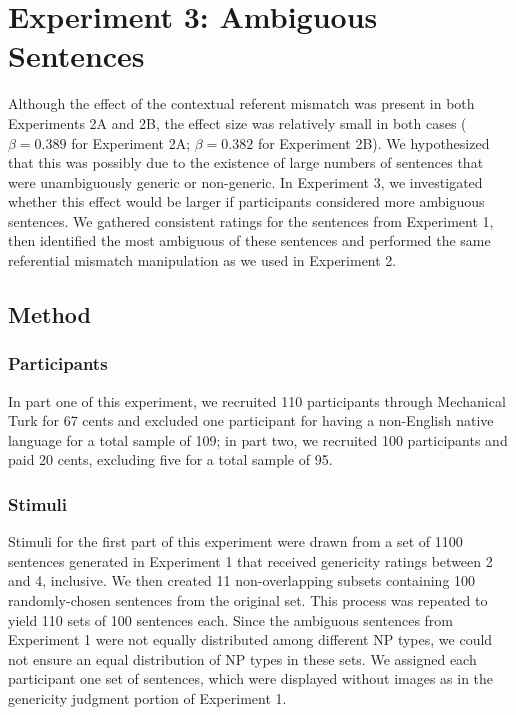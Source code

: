 \documentclass[10pt,letterpaper]{article}
\begin{document}



\section{Experiment 3: Ambiguous Sentences}

Although the effect of the contextual referent mismatch was present in both Experiments 2A and 2B, the effect size was relatively small in both cases (\(\beta = 0.389\) for Experiment 2A; \(\beta = 0.382\) for Experiment 2B). We hypothesized that this was possibly due to the existence of large numbers of sentences that were unambiguously generic or non-generic. In Experiment 3, we investigated whether this effect would be larger if participants considered more ambiguous sentences. We gathered consistent ratings for the sentences from Experiment 1, then identified the most ambiguous of these sentences and performed the same referential mismatch manipulation as we used in Experiment 2. 

\subsection{Method} 

\subsubsection{Participants}

In part one of this experiment, we recruited 110 participants through Mechanical Turk for 67 cents and excluded one participant for having a non-English native language for a total sample of 109; in part two, we recruited 100 participants and paid 20 cents, excluding five for a total sample of 95.

\subsubsection{Stimuli}  

Stimuli for the first part of this experiment were drawn from a set of 1100 sentences generated in Experiment 1 that received genericity ratings between 2 and 4, inclusive. We then created 11 non-overlapping subsets containing 100 randomly-chosen sentences from the original set. This process was repeated to yield 110 sets of 100 sentences each. Since the ambiguous sentences from Experiment 1 were not equally distributed among different NP types, we could not ensure an equal distribution of NP types in these sets. We assigned each participant one set of sentences, which were displayed without images as in the genericity judgment portion of Experiment 1.
\end{document}
